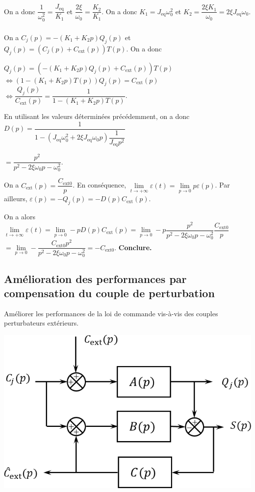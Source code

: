 \documentclass[10pt,fleqn]{article} %
\begin{document}
On a donc $\dfrac{1}{\omega_0^2}=\dfrac{J_{\text{eq}}}{K_1}$ et $\dfrac{2\xi}{\omega_0}=\dfrac{K_2}{K_1}$. On a donc $K_1=J_{\text{eq}}\omega_0^2$ et $K_2=\dfrac{2\xi K_1}{\omega_0}=2\xi J_{\text{eq}}\omega_0$.

\subparagraph{}%
On a $C_j(p)=-\left(K_1+K_2 p\right) Q_j(p)$ et $Q_j(p)=\left(C_j(p)+C_{\text{ext}}(p)\right)T(p)$.  On a donc  

$Q_j(p)=\left(-\left(K_1+K_2 p\right) Q_j(p)+C_{\text{ext}}(p)\right)T(p)$
$\Leftrightarrow \left(1-\left(K_1+K_2 p\right)T(p) \right)Q_j(p)=C_{\text{ext}}(p)$
$\Leftrightarrow \dfrac{Q_j(p)}{C_{\text{ext}}(p)}=\dfrac{1}{1-\left(K_1+K_2 p\right)T(p) }$.

En utilisant les valeurs déterminées précédemment, on a donc $D(p)=\dfrac{1}{1-\left(J_{\text{eq}}\omega_0^2+2\xi J_{\text{eq}}\omega_0 p\right)\dfrac{1}{J_{\text{eq}}p^2} }$

$=\dfrac{p^2}{p^2-2\xi\omega_0 p-\omega_0^2 }$.

On a $C_{\text{ext}}(p)=\dfrac{C_{\text{ext} 0}}{p}$. En conséquence, 
$\lim\limits_{t\to +\infty} \varepsilon(t) = \lim\limits_{p\to 0} p\varepsilon(p)$.
Par ailleurs,  $\varepsilon(p)=-Q_j(p)=-D(p)C_{\text{ext}}(p)$.

On a alors $\lim\limits_{t\to +\infty} \varepsilon(t) = \lim\limits_{p\to 0} -pD(p)C_{\text{ext}}(p)= \lim\limits_{p\to 0} -p\dfrac{p^2}{p^2-2\xi\omega_0 p-\omega_0^2 }\dfrac{C_{\text{ext} 0}}{p}$
$= \lim\limits_{p\to 0} -\dfrac{C_{\text{ext} 0}p^2}{p^2-2\xi\omega_0 p-\omega_0^2 }  = -C_{\text{ext} 0}$.
\textbf{Conclure.}


\subsection{Amélioration des performances par compensation du couple de perturbation}
\begin{obj}
Améliorer les performances de la loi de commande vis-à-vis des couples perturbateurs extérieurs.
\end{obj}

\begin{center}
\includegraphics[width=.4\linewidth]{images/fig_04}
\end{center}
\end{document}
